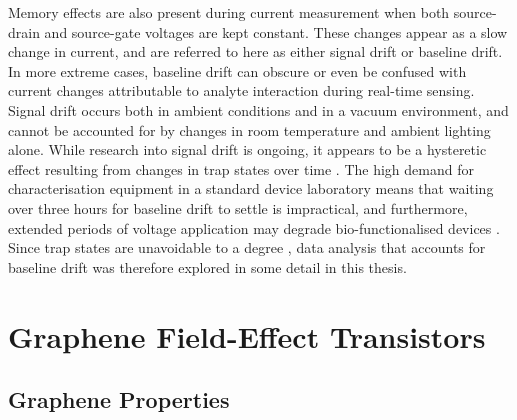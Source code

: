 \documentclass[
  a4paper,
]{scrbook}
\begin{document}
Memory effects are also present during current measurement when both
source-drain and source-gate voltages are kept constant. These changes
appear as a slow change in current, and are referred to here as either
signal drift or baseline drift. In more extreme cases, baseline drift
can obscure or even be confused with current changes attributable to
analyte interaction during real-time sensing. Signal drift occurs both
in ambient conditions and in a vacuum environment, and cannot be
accounted for by changes in room temperature and ambient lighting alone.
While research into signal drift is ongoing, it appears to be a
hysteretic effect resulting from changes in trap states over time
\autocite{Lin2006,Bargaoui2018,Noyce2019}. The high demand for
characterisation equipment in a standard device laboratory means that
waiting over three hours for baseline drift to settle is impractical,
and furthermore, extended periods of voltage application may degrade
bio-functionalised devices \autocite{Noyce2019}. Since trap states are
unavoidable to a degree \autocite{DiMaria1993,Collins2000}, data
analysis that accounts for baseline drift was therefore explored in some
detail in this thesis.

\hypertarget{graphene-field-effect-transistors}{%
\section{Graphene Field-Effect
Transistors}\label{graphene-field-effect-transistors}}

\hypertarget{graphene-properties}{%
\subsection{Graphene Properties}\label{graphene-properties}}
\end{document}

